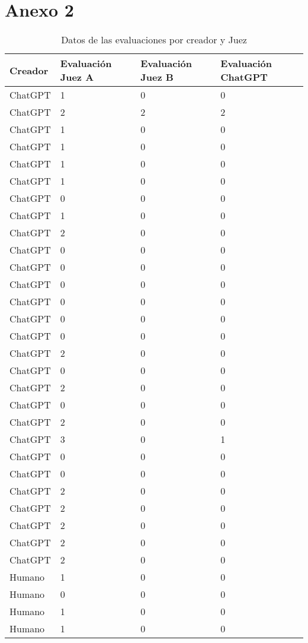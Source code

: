 \section{Anexo 2}
\setlength\LTleft{-0.125cm}
\setlength\LTright{-0.125cm}
\begin{footnotesize}
\begin{longtable}{llll}
\caption{Datos de las evaluaciones por creador y Juez}
\label{tab-13}
\\
\toprule
Creador & Evaluación Juez A & Evaluación Juez B & Evaluación ChatGPT \\
\midrule
	ChatGPT & 1 & 0 & 0 \\
	ChatGPT & 2 & 2 & 2 \\
	ChatGPT & 1 & 0 & 0 \\
	ChatGPT & 1 & 0 & 0 \\
	ChatGPT & 1 & 0 & 0 \\
	ChatGPT & 1 & 0 & 0 \\
	ChatGPT & 0 & 0 & 0 \\
	ChatGPT & 1 & 0 & 0 \\
	ChatGPT & 2 & 0 & 0 \\
	ChatGPT & 0 & 0 & 0 \\
	ChatGPT & 0 & 0 & 0 \\
	ChatGPT & 0 & 0 & 0 \\
	ChatGPT & 0 & 0 & 0 \\
	ChatGPT & 0 & 0 & 0 \\
	ChatGPT & 0 & 0 & 0 \\
	ChatGPT & 2 & 0 & 0 \\
	ChatGPT & 0 & 0 & 0 \\
	ChatGPT & 2 & 0 & 0 \\
	ChatGPT & 0 & 0 & 0 \\
	ChatGPT & 2 & 0 & 0 \\
	ChatGPT & 3 & 0 & 1 \\
	ChatGPT & 0 & 0 & 0 \\
	ChatGPT & 0 & 0 & 0 \\
	ChatGPT & 2 & 0 & 0 \\
	ChatGPT & 2 & 0 & 0 \\
	ChatGPT & 2 & 0 & 0 \\
	ChatGPT & 2 & 0 & 0 \\
	ChatGPT & 2 & 0 & 0 \\
	Humano & 1 & 0 & 0 \\
	Humano & 0 & 0 & 0 \\
	Humano & 1 & 0 & 0 \\
	Humano & 1 & 0 & 0 \\

\end{longtable}
\end{footnotesize}
